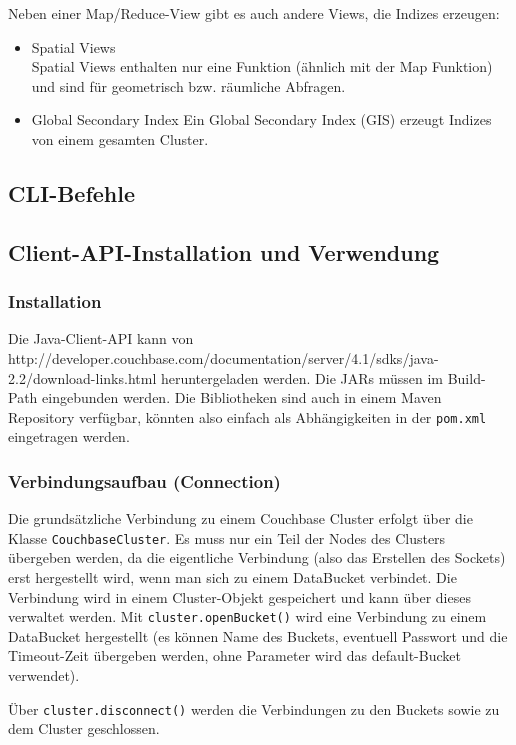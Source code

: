 Neben einer Map/Reduce-View gibt es auch andere Views, die Indizes erzeugen:
\begin{itemize}
	\item Spatial Views\\
	Spatial Views enthalten nur eine Funktion (ähnlich mit der Map Funktion) und sind für geometrisch bzw. räumliche Abfragen.
	\item Global Secondary Index
	Ein Global Secondary Index (GIS) erzeugt Indizes von einem gesamten Cluster.
\end{itemize}

\subsection{CLI-Befehle}

\subsection{Client-API-Installation und Verwendung}
\subsubsection{Installation}
Die Java-Client-API kann von http://developer.couchbase.com/documentation/server/4.1/sdks/java-2.2/download-links.html heruntergeladen werden. Die JARs müssen im Build-Path eingebunden werden. Die Bibliotheken sind auch in einem Maven Repository verfügbar, könnten also einfach als Abhängigkeiten in der \texttt{pom.xml} eingetragen werden.
\subsubsection{Verbindungsaufbau (Connection)}
Die grundsätzliche Verbindung zu einem Couchbase Cluster erfolgt über die Klasse \texttt{CouchbaseCluster}. Es muss nur ein Teil der Nodes des Clusters übergeben werden, da die eigentliche Verbindung (also das Erstellen des Sockets) erst hergestellt wird, wenn man sich zu einem DataBucket verbindet. Die Verbindung wird in einem Cluster-Objekt gespeichert und kann über dieses verwaltet werden.
Mit \texttt{cluster.openBucket()} wird eine Verbindung zu einem DataBucket hergestellt (es können Name des Buckets, eventuell Passwort und die Timeout-Zeit übergeben werden, ohne Parameter wird das default-Bucket verwendet).

Über \texttt{cluster.disconnect()} werden die Verbindungen zu den Buckets sowie zu dem Cluster geschlossen.

